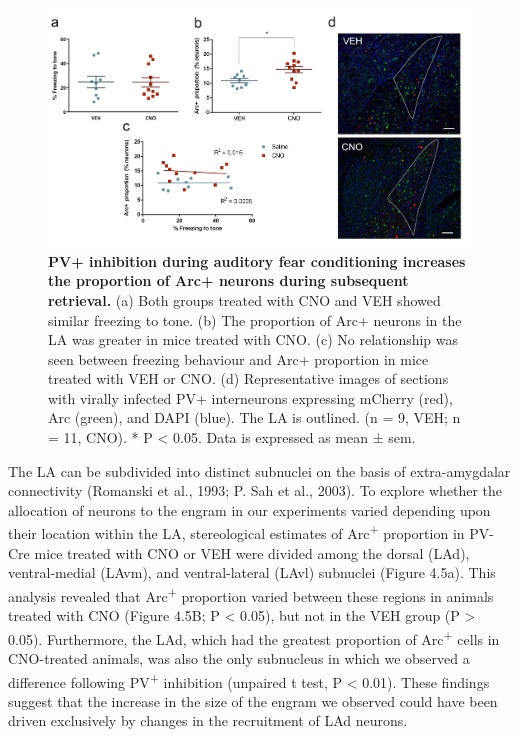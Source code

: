\documentclass[12pt,a4paperpaper,]{report}
\begin{document}
\begin{figure}[htbp]
\centering
\includegraphics{source/figures/figure_4.jpg}
\caption{\textbf{PV+ inhibition during auditory fear conditioning
increases the proportion of Arc+ neurons during subsequent retrieval.}
(a) Both groups treated with CNO and VEH showed similar freezing to
tone. (b) The proportion of Arc+ neurons in the LA was greater in mice
treated with CNO. (c) No relationship was seen between freezing
behaviour and Arc+ proportion in mice treated with VEH or CNO. (d)
Representative images of sections with virally infected PV+ interneurons
expressing mCherry (red), Arc (green), and DAPI (blue). The LA is
outlined. (n = 9, VEH; n = 11, CNO). * P \textless{} 0.05. Data is
expressed as mean ± sem. \label{ref_a_figure}}
\end{figure}

The LA can be subdivided into distinct subnuclei on the basis of
extra-amygdalar connectivity (Romanski et al., 1993; P. Sah et al.,
2003). To explore whether the allocation of neurons to the engram in our
experiments varied depending upon their location within the LA,
stereological estimates of Arc\textsuperscript{+} proportion in PV-Cre
mice treated with CNO or VEH were divided among the dorsal (LAd),
ventral-medial (LAvm), and ventral-lateral (LAvl) subnuclei (Figure
4.5a). This analysis revealed that Arc\textsuperscript{+} proportion
varied between these regions in animals treated with CNO (Figure 4.5B; P
\textless{} 0.05), but not in the VEH group (P \textgreater{} 0.05).
Furthermore, the LAd, which had the greatest proportion of
Arc\textsuperscript{+} cells in CNO-treated animals, was also the only
subnucleus in which we observed a difference following
PV\textsuperscript{+} inhibition (unpaired t test, P \textless{} 0.01).
These findings suggest that the increase in the size of the engram we
observed could have been driven exclusively by changes in the
recruitment of LAd neurons.
\end{document}
